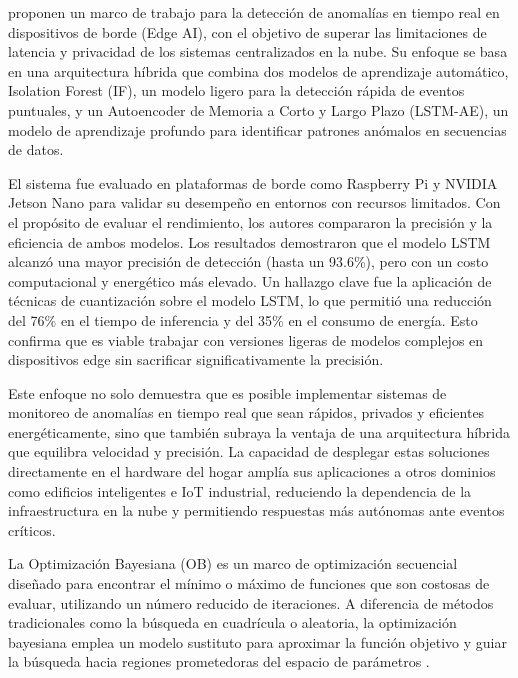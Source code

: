 \citeauthor{reis2025edge} \citeyear{reis2025edge} proponen un marco de trabajo para la detección de anomalías en tiempo real en dispositivos de borde (Edge AI), con el objetivo de superar las limitaciones de latencia y privacidad de los sistemas centralizados en la nube. Su enfoque se basa en una arquitectura híbrida que combina dos modelos de aprendizaje automático, Isolation Forest (IF), un modelo ligero para la detección rápida de eventos puntuales, y un Autoencoder de Memoria a Corto y Largo Plazo (LSTM-AE), un modelo de aprendizaje profundo para identificar patrones anómalos en secuencias de datos.

El sistema fue evaluado en plataformas de borde como Raspberry Pi y NVIDIA Jetson Nano para validar su desempeño en entornos con recursos limitados. Con el propósito de evaluar el rendimiento, los autores compararon la precisión y la eficiencia de ambos modelos. Los resultados demostraron que el modelo LSTM alcanzó una mayor precisión de detección (hasta un 93.6\%), pero con un costo computacional y energético más elevado. Un hallazgo clave fue la aplicación de técnicas de cuantización sobre el modelo LSTM, lo que permitió una reducción del 76\% en el tiempo de inferencia y del 35\% en el consumo de energía. Esto confirma que es viable trabajar con versiones ligeras de modelos complejos en dispositivos edge sin sacrificar significativamente la precisión.

Este enfoque no solo demuestra que es posible implementar sistemas de monitoreo de anomalías en tiempo real que sean rápidos, privados y eficientes energéticamente, sino que también subraya la ventaja de una arquitectura híbrida que equilibra velocidad y precisión. La capacidad de desplegar estas soluciones directamente en el hardware del hogar amplía sus aplicaciones a otros dominios como edificios inteligentes e IoT industrial, reduciendo la dependencia de la infraestructura en la nube y permitiendo respuestas más autónomas ante eventos críticos.


La Optimización Bayesiana (OB) es un marco de optimización secuencial diseñado para encontrar el mínimo o máximo de funciones que son costosas de evaluar, utilizando un número reducido de iteraciones. A diferencia de métodos tradicionales como la búsqueda en cuadrícula o aleatoria, la optimización bayesiana emplea un modelo sustituto para aproximar la función objetivo y guiar la búsqueda hacia regiones prometedoras del espacio de parámetros \citeauthor{gardner2014bayesian} \citeyear{gardner2014bayesian}.


